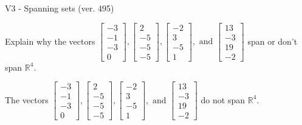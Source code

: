 \begin{exercise}
  \begin{exerciseTitle}V3 - Spanning sets (ver. 495)\end{exerciseTitle}
  \begin{exerciseStatement}
    Explain why the vectors \(\left[\begin{array}{r}
-3 \\
-1 \\
-3 \\
0
\end{array}\right] , \left[\begin{array}{r}
2 \\
-5 \\
-5 \\
-5
\end{array}\right] , \left[\begin{array}{r}
-2 \\
3 \\
-5 \\
1
\end{array}\right] , \text{ and } \left[\begin{array}{r}
13 \\
-3 \\
19 \\
-2
\end{array}\right]\) span or don't span \(\mathbb{R}^4\). 
	


  \end{exerciseStatement}
  \begin{exerciseAnswer}
   The vectors \(\left[\begin{array}{r}
-3 \\
-1 \\
-3 \\
0
\end{array}\right] , \left[\begin{array}{r}
2 \\
-5 \\
-5 \\
-5
\end{array}\right] , \left[\begin{array}{r}
-2 \\
3 \\
-5 \\
1
\end{array}\right] , \text{ and } \left[\begin{array}{r}
13 \\
-3 \\
19 \\
-2
\end{array}\right]\) 
  	 do not  
	span \(\mathbb{R}^4\).
  


  \end{exerciseAnswer}
\end{exercise}